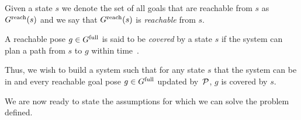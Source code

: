 \documentclass[a4paper,10pt]{article}
\begin{document}
Given a state $s$ we denote the set of all goals that are reachable from $s$ as $G^{\rm reach}(s)$ and we say that $G^{\rm reach}(s)$ is \emph{reachable} from $s$.

\begin{definition}
    A reachable pose $g \in G^{\textrm{full}}$ is said to be \emph{covered} by a state $s$ if 
    the system can plan a path from $s$ to $g$ within time~\Tbound.
\end{definition}

Thus, we wish to build a system such that 
for any state $s$ that the system can be in 
and every reachable goal pose $g \in G^{\textrm{full}}$ updated by~$\mathcal{P}$,
$g$ is covered by $s$.


We are now ready to state the assumptions for which we can solve the problem defined.
\end{document}
